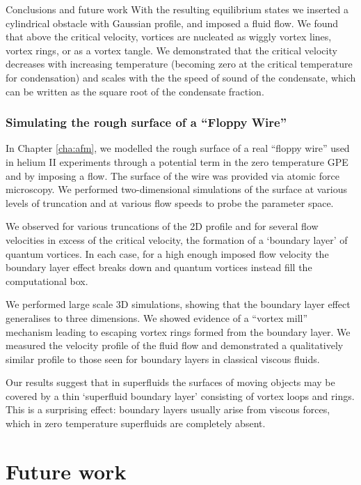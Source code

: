 \begin{chapter}{\label{cha:conc}Conclusions and future work}
With the resulting equilibrium states we inserted a cylindrical obstacle with Gaussian profile, and imposed a fluid flow.  We found that above the critical velocity, vortices are nucleated as wiggly vortex lines, vortex rings, or as a vortex tangle. We demonstrated that the critical velocity decreases with increasing temperature (becoming zero at the critical temperature for condensation) and scales with the the speed of sound of the condensate, which can be written as the square root of the condensate fraction.

\subsubsection{Simulating the rough surface of a ``Floppy Wire''}
In Chapter \ref{cha:afm}, we modelled the rough surface of a real ``floppy wire'' used in helium II experiments through a potential term in the zero temperature GPE and by imposing a flow. The surface of the wire was provided via atomic force microscopy. We performed two-dimensional simulations of the surface at various levels of truncation and at various flow speeds to probe the parameter space.

We observed for various truncations of the 2D profile and for several flow velocities in excess of the critical velocity, the formation of a `boundary layer' of quantum vortices. In each case, for a high enough imposed flow velocity the boundary layer effect breaks down and quantum vortices instead fill the computational box.

We performed large scale 3D simulations, showing that the boundary layer effect generalises to three dimensions. We showed evidence of a ``vortex mill'' mechanism leading to escaping vortex rings formed from the boundary layer. We measured the velocity profile of the fluid flow and demonstrated a qualitatively similar profile to those seen for boundary layers in classical viscous fluids.

Our results suggest that in superfluids the surfaces of moving objects may be covered by a thin `superfluid boundary layer' consisting of vortex loops and rings. This is a surprising effect: boundary layers usually arise from viscous forces, which in zero temperature superfluids are completely absent.

\section{Future work} 

\end{chapter}
